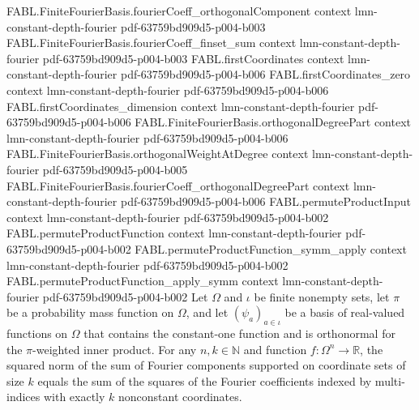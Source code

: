 \begin{theorem}
\proofstep
  {FABL.FiniteFourierBasis.fourierCoeff_orthogonalComponent}
  {context}
  {lmn-constant-depth-fourier}
  {pdf-63759bd909d5-p004-b003}
\proofstep
  {FABL.FiniteFourierBasis.fourierCoeff_finset_sum}
  {context}
  {lmn-constant-depth-fourier}
  {pdf-63759bd909d5-p004-b003}
\proofstep
  {FABL.firstCoordinates}
  {context}
  {lmn-constant-depth-fourier}
  {pdf-63759bd909d5-p004-b006}
\proofstep
  {FABL.firstCoordinates_zero}
  {context}
  {lmn-constant-depth-fourier}
  {pdf-63759bd909d5-p004-b006}
\proofstep
  {FABL.firstCoordinates_dimension}
  {context}
  {lmn-constant-depth-fourier}
  {pdf-63759bd909d5-p004-b006}
\proofstep
  {FABL.FiniteFourierBasis.orthogonalDegreePart}
  {context}
  {lmn-constant-depth-fourier}
  {pdf-63759bd909d5-p004-b006}
\proofstep
  {FABL.FiniteFourierBasis.orthogonalWeightAtDegree}
  {context}
  {lmn-constant-depth-fourier}
  {pdf-63759bd909d5-p004-b005}
\proofstep
  {FABL.FiniteFourierBasis.fourierCoeff_orthogonalDegreePart}
  {context}
  {lmn-constant-depth-fourier}
  {pdf-63759bd909d5-p004-b006}
\proofstep
  {FABL.permuteProductInput}
  {context}
  {lmn-constant-depth-fourier}
  {pdf-63759bd909d5-p004-b002}
\proofstep
  {FABL.permuteProductFunction}
  {context}
  {lmn-constant-depth-fourier}
  {pdf-63759bd909d5-p004-b002}
\proofstep
  {FABL.permuteProductFunction_symm_apply}
  {context}
  {lmn-constant-depth-fourier}
  {pdf-63759bd909d5-p004-b002}
\proofstep
  {FABL.permuteProductFunction_apply_symm}
  {context}
  {lmn-constant-depth-fourier}
  {pdf-63759bd909d5-p004-b002}
Let $\Omega$ and $\iota$ be finite nonempty sets, let $\pi$ be a probability mass
function on $\Omega$, and let $(\psi_a)_{a\in\iota}$ be a basis of real-valued functions
on $\Omega$ that contains the constant-one function and is orthonormal for the
$\pi$-weighted inner product. For any $n,k\in\mathbb N$ and function
$f:\Omega^n\to\mathbb R$, the squared norm of the sum of Fourier components supported on
coordinate sets of size $k$ equals the sum of the squares of the Fourier coefficients
indexed by multi-indices with exactly $k$ nonconstant coordinates.
\end{theorem}

